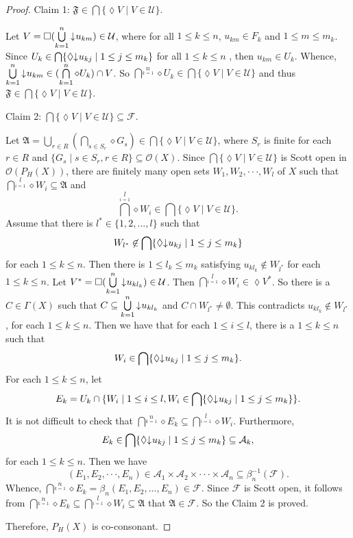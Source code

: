 \documentclass[preprint,12pt]{elsarticle}
\numberwithin{equation}{section}
\newcommand{\dn}{\mathord{\downarrow}\hspace{0.05em}}
\begin{document}
\begin{proof}
Claim 1: $\mathfrak{F}\in\bigcap\{\lozenge V\mid V\in\mathcal{U}\}$.

Let $V=\Box(\bigcup\limits^{n}\limits_{k=1}\dn u_{km})\in\mathcal{U}$, where for all $1\leq k\leq n$, $u_{km}\in F_{k}$ and $1\leq m\leq m_{k}$.
Since $U_{k}\in\bigcap\{\lozenge \dn u_{kj}\mid 1\leq j\leq m_{k}\}$ for all $1\leq k\leq n$ , then $u_{km}\in U_{k}$. Whence, $\bigcup\limits^{n}\limits_{k=1}\dn u_{km}\in(\bigcap\limits^{n}\limits_{k=1} \diamond U_{k})\cap V$. So $\bigcap\limits^{n}\limits_{k=1} \diamond U_{k}\in\bigcap\{\lozenge V\mid V\in\mathcal{U}\}$ and thus $\mathfrak{F}\in\bigcap\{\lozenge V\mid V\in\mathcal{U}\}$.

Claim 2: $\bigcap\{\lozenge V\mid V\in\mathcal{U}\}\subseteq\mathcal{F}$.

Let $\mathfrak{A}=\bigcup\limits_{r\in R}(\bigcap\limits_{s\in S_{r}}\diamond G_{s})\in\bigcap\{\lozenge V\mid V\in\mathcal{U}\}$, where $S_{r}$ is finite for each $r\in R$ and $\{G_{s}\mid s\in S_{r},r\in R\}\subseteq\mathcal{O}(X)$. Since $\bigcap\{\lozenge V\mid V\in\mathcal{U}\}$ is Scott open in $\mathcal{O}(P_{H}(X))$, there are finitely many open sets $W_{1}, W_{2},\cdot\cdot\cdot,W_{l}$ of $X$ such that $\bigcap\limits^{l}\limits_{i=1}\diamond W_{i}\subseteq \mathfrak{A}$ and $$\bigcap\limits^{l}\limits_{i=1}\diamond W_{i}\in\bigcap\{\lozenge V\mid V\in\mathcal{U}\}.$$ Assume that there is $l^{\ast}\in\{1,2,...,l\}$ such that $$W_{l^{\ast}}\not\in\bigcap\{\lozenge \dn u_{kj}\mid 1\leq j\leq m_{k}\}$$ for each $1\leq k\leq n$. Then there is $1\leq l_{k}\leq m_{k}$ satisfying $u_{kl_{k}}\not\in W_{l^{\ast}}$ for each $1\leq k\leq n$. Let $V^{\ast}=\Box(\bigcup\limits^{n}\limits_{k=1}\dn u_{kl_{k}})\in\mathcal{U}$. Then $\bigcap\limits^{l}\limits_{i=1}\diamond W_{i}\in\lozenge V^{\ast}$. So there is a $C\in\Gamma(X)$ such that $C\subseteq\bigcup\limits^{n}\limits_{k=1}\dn u_{kl_{k}}$ and $C\cap W_{l^{\ast}}\neq\emptyset$. This contradicts $u_{kl_{k}}\not\in W_{l^{\ast}}$, for each $1\leq k\leq n$. Then we have that for each $1\leq i\leq l$, there is a $1\leq k\leq n$ such that $$W_{i}\in\bigcap\{\lozenge \dn u_{kj}\mid 1\leq j\leq m_{k}\}.$$ For each $1\leq k\leq n$, let $$E_{k}=U_{k}\cap\{W_{i}\mid 1\leq i\leq l,W_{i}\in\bigcap\{\lozenge \dn u_{kj}\mid 1\leq j\leq m_{k}\}\}.$$ It is not difficult to check that $\bigcap\limits^{n}\limits_{k=1}\diamond E_{k}\subseteq\bigcap\limits^{l}\limits_{i=1}\diamond W_{i}$. Furthermore, $$E_{k}\in \bigcap\{\lozenge \dn u_{kj}\mid 1\leq j\leq m_{k}\}\subseteq\mathcal{A}_{k},$$ for each $1\leq k\leq n$. Then we have $$(E_{1},E_{2},\cdot\cdot\cdot,E_{n})\in\mathcal{A}_{1}\times\mathcal{A}_{2}\times\cdot\cdot\cdot\times\mathcal{A}_{n}\subseteq\beta_{n}^{-1}(\mathcal{F}).$$  Whence, $\bigcap\limits^{n}\limits_{k=1}\diamond E_{k}=\beta_{n}(E_{1},E_{2},...,E_{n})\in\mathcal{F}$. Since $\mathcal{F}$ is Scott open, it follows from $\bigcap\limits^{n}\limits_{k=1}\diamond E_{k}\subseteq\bigcap\limits^{l}\limits_{i=1}\diamond W_{i}\subseteq\mathfrak{A}$ that $\mathfrak{A}\in\mathcal{F}$. So the Claim 2 is proved.

Therefore, $P_{H}(X)$ is co-consonant.\end{proof}
\end{document}
